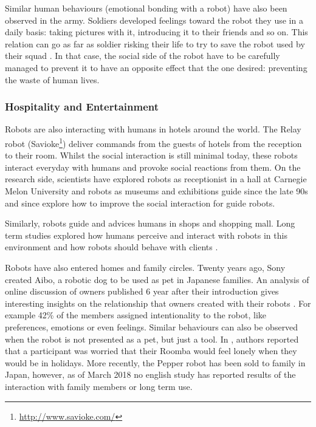     Similar human behaviours (emotional bonding with a robot) have also been observed in the army. Soldiers developed feelings toward the robot they use in a daily basis: taking pictures with it, introducing it to their friends and so on. This relation can go as far as soldier risking their life to try to save the robot used by their squad \citep{singer2009wired}. In that case, the social side of the robot have to be carefully managed to prevent it to have an opposite effect that the one desired: preventing the waste of human lives.
		
\subsubsection{Hospitality and Entertainment} 
	
	Robots are also interacting with humans in hotels around the world. The Relay robot (Savioke\footnote{\url{http://www.savioke.com/}}) deliver commands from the guests of hotels from the reception to their room. Whilst the social interaction is still minimal today, these robots interact everyday with humans and provoke social reactions from them. On the research side, scientists have explored robots as receptionist in a hall at Carnegie Melon University \citep{gockley2005designing} and robots as museums and exhibitions guide since the late 90s \citep{thrun1999minerva,burgard1999experiences} and since explore how to improve the social interaction for guide robots.
	
	Similarly, robots guide and advices humans in shops and shopping mall. Long term studies explored how humans perceive and interact with robots in this environment \cite{kanda2009affective} and how robots should behave with clients \cite{kanda2008will}.

    Robots have also entered homes and family circles. Twenty years ago, Sony created Aibo, a robotic dog to be used as pet in Japanese families. An analysis of online discussion of owners published 6 year after their introduction gives interesting insights on the relationship that owners created with their robots \citep{friedman2003hardware}. For example 42\% of the members assigned intentionality to the robot, like preferences, emotions or even feelings. Similar behaviours can also be observed when the robot is not presented as a pet, but just a tool. In \cite{fink2013living}, authors reported that a participant was worried that their Roomba would feel lonely when they would be in holidays. More recently, the Pepper robot has been sold to family in Japan, however, as of March 2018 no english study has reported results of the interaction with family members or long term use.


